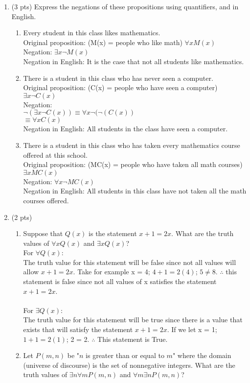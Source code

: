 \documentclass[12pt]{article}
\begin{document}
\begin{enumerate}
\item (3 pts)
Express the negations of these propositions using quantifiers,
and in English.
\begin{enumerate}
	\item Every student in this class likes mathematics.
    \\Original proposition: (M(x) = people who like math)
     $\forall x M(x)$
     \\Negation: $\exists x \lnot M(x)$
     \\Negation in English: It is the case that not all students like mathematics.\\

\item  There is a student in this class who has never seen a computer.
    \\Original proposition: (C(x) = people who have seen a computer) $\exists x \lnot C(x)$
    \\Negation:
    \\$\lnot (\exists x \lnot C(x)) \equiv \forall x \lnot(\lnot (C(x))$
    \\$\equiv \forall x C(x)$
    \\Negation in English: All students in the class have seen a computer.\\

\item There is a student in this class who has taken every
mathematics course offered at this school.
\\Original proposition: (MC(x) = people who have taken all math courses) $\exists x MC(x)$
\\Negation: $\forall x \lnot MC(x)$
\\Negation in English: All students in this class have not taken all the math courses offered.\\

\end{enumerate}
\item (2 pts)
\begin{enumerate}
	 \item Suppose that $Q(x)$ is the statement $x + 1 = 2x.$ What are the truth values of $\forall x Q(x)$ and $\exists x Q(x)$?
\\For $\forall Q(x)$:
\\The truth value for this statement will be false since not all values will allow $x + 1 = 2x$. Take for example x = 4; $4 + 1 = 2(4)$; $5 \neq 8$. $\therefore$ this statement is false since not all values of x satisfies the statement $x + 1 = 2x$.\\
\\For $\exists Q(x)$:
\\The truth value for this statement will be true since there is a value that exists that will satisfy the statement $x + 1 = 2x$. If we let x = 1; $1 + 1 = 2(1)$; 2 = 2. $\therefore$ This statement is True.
	\\
	\item Let $P(m, n)$ be "$n$ is greater than or equal to $m$" where the domain (universe of discourse) is the set of
	nonnegative integers. What are the truth values of $\exists n \forall m P(m, n)$ and $\forall m\exists n  P(m, n)$?


\end{enumerate}
\end{enumerate}
\end{document}
